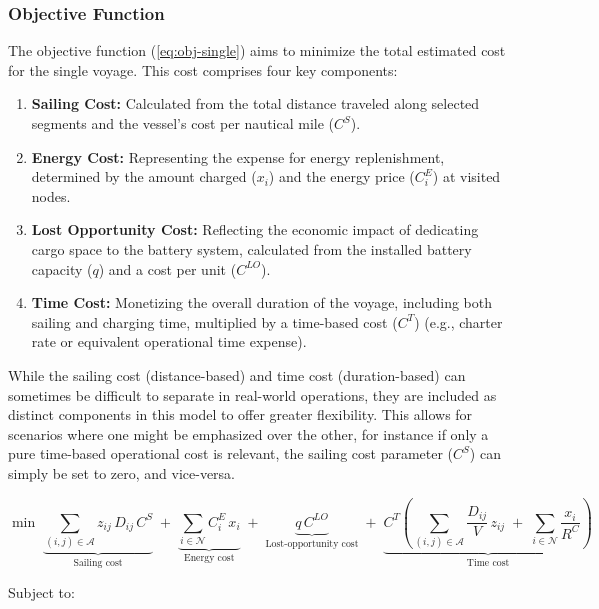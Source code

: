 \subsubsection*{Objective Function}

The objective function (\ref{eq:obj-single}) aims to minimize the total estimated cost for the single voyage. This cost comprises four key components:

\begin{enumerate}
\item \textbf{Sailing Cost:} Calculated from the total distance traveled along selected segments and the vessel's cost per nautical mile ($C^{S}$).
\item \textbf{Energy Cost:} Representing the expense for energy replenishment, determined by the amount charged ($x_{i}$) and the energy price ($C^{E}_{i}$) at visited nodes.
\item \textbf{Lost Opportunity Cost:} Reflecting the economic impact of dedicating cargo space to the battery system, calculated from the installed battery capacity ($q$) and a cost per unit ($C^{LO}$).
\item \textbf{Time Cost:} Monetizing the overall duration of the voyage, including both sailing and charging time, multiplied by a time-based cost ($C^{T}$) (e.g., charter rate or equivalent operational time expense).
\end{enumerate}

While the sailing cost (distance-based) and time cost (duration-based) can sometimes be difficult to separate in real-world operations, they are included as distinct components in this model to offer greater flexibility. This allows for scenarios where one might be emphasized over the other, for instance if only a pure time-based operational cost is relevant, the sailing cost parameter ($C^{S}$) can simply be set to zero, and vice-versa.

\begin{equation}
\min\;
\underbrace{\sum_{(i,j)\in\mathcal{A}} z_{ij}\,D_{ij}\,C^{S}}_{\text{Sailing cost}}
\;+\;
\underbrace{\sum_{i\in\mathcal{N}} C^{E}_{i}\,x_{i}}_{\text{Energy cost}}
\;+\;
\underbrace{q\,C^{LO}}_{\text{Lost-opportunity cost}}
\;+\;
\underbrace{C^{T}\left(\sum_{(i,j)\in\mathcal{A}} \frac{D_{ij}}{V}\,z_{ij}
      \;+\; \sum_{i\in\mathcal{N}} \frac{x_{i}}{R^{C}}\right)}_{\text{Time cost}}
\label{eq:obj-single}
\end{equation}

Subject to:

